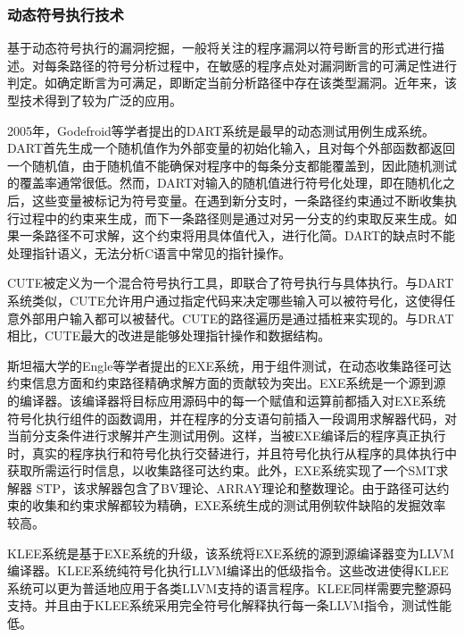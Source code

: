 \subsubsection{动态符号执行技术}


基于动态符号执行的漏洞挖掘，一般将关注的程序漏洞以符号断言的形式进行描述。对每条路径的符号分析过程中，在敏感的程序点处对漏洞断言的可满足性进行判定。如确定断言为可满足，即断定当前分析路径中存在该类型漏洞。近年来，该型技术得到了较为广泛的应用。

2005年，Godefroid等学者提出的DART系统是最早的动态测试用例生成系统。DART首先生成一个随机值作为外部变量的初始化输入，且对每个外部函数都返回一个随机值，由于随机值不能确保对程序中的每条分支都能覆盖到，因此随机测试的覆盖率通常很低。然而，DART对输入的随机值进行符号化处理，即在随机化之后，这些变量被标记为符号变量。在遇到新分支时，一条路径约束通过不断收集执行过程中的约束来生成，而下一条路径则是通过对另一分支的约束取反来生成。如果一条路径不可求解，这个约束将用具体值代入，进行化简。DART的缺点时不能处理指针语义，无法分析C语言中常见的指针操作。

CUTE被定义为一个混合符号执行工具，即联合了符号执行与具体执行。与DART系统类似，CUTE允许用户通过指定代码来决定哪些输入可以被符号化，这使得任意外部用户输入都可以被替代。CUTE的路径遍历是通过插桩来实现的。与DRAT相比，CUTE最大的改进是能够处理指针操作和数据结构。

斯坦福大学的Engle等学者提出的EXE系统，用于组件测试，在动态收集路径可达约束信息方面和约束路径精确求解方面的贡献较为突出。EXE系统是一个源到源的编译器。该编译器将目标应用源码中的每一个赋值和运算前都插入对EXE系统符号化执行组件的函数调用，并在程序的分支语句前插入一段调用求解器代码，对当前分支条件进行求解并产生测试用例。这样，当被EXE编译后的程序真正执行时，真实的程序执行和符号化执行交替进行，并且符号化执行从程序的具体执行中获取所需运行时信息，以收集路径可达约束。此外，EXE系统实现了一个SMT求解器 STP，该求解器包含了BV理论、ARRAY理论和整数理论。由于路径可达约束的收集和约束求解都较为精确，EXE系统生成的测试用例软件缺陷的发掘效率较高。

KLEE系统是基于EXE系统的升级，该系统将EXE系统的源到源编译器变为LLVM编译器。KLEE系统纯符号化执行LLVM编译出的低级指令。这些改进使得KLEE系统可以更为普适地应用于各类LLVM支持的语言程序。KLEE同样需要完整源码支持。并且由于KLEE系统采用完全符号化解释执行每一条LLVM指令，测试性能低。

